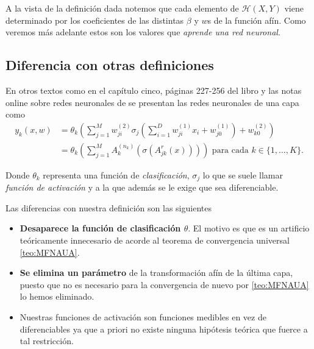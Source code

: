 A la vista de la definición dada notemos que cada elemento de 
$\mathcal{H}(X,Y)$ viene determinado por los coeficientes 
de las distintas $\beta$ y  $w$s de la función afín. Como veremos más adelante estos son los valores que \textit{aprende una red neuronal}.

\subsection*{Diferencia con otras definiciones}  \label{subsection:diferencia-otras-definiciones-RRNN}

En otros textos como en el capítulo cinco, páginas 227-256 del libro \cite{BishopPaterRecognition} y las notas online sobre redes neuronales de \cite{MostafaLearningFromData} se presentan las redes neuronales de una capa como 
\begin{align}
    y_k(x,w) &= \theta_k 
    \left( 
        \sum^M_{j=1} w_{ji}^{(2)}
        \sigma_j 
        \left(
            \sum_{i=1}^D w_{ji}^{(1)} x_i + w_{j0}^{(1)}
        \right)
        + w_{k0}^{(2)}
    \right) 
    \\
    & = 
    \theta_k 
    \left( 
        \sum^M_{j=1} A^{(n_k)}_{k}
        \left(
            \sigma 
            \left(
                A^{r}_{j k}
                \left(
                    x
                \right)
            \right)
        \right)
    \right)
    \text{ para cada  } k \in \{1, \ldots, K \}.
\end{align}

Donde $\theta_k$ representa una función de \textit{clasificación}, 
$\sigma_j$ lo que se suele llamar \textit{función de activación} y a la que además se le exige que sea diferenciable.

Las diferencias con nuestra definición son las siguientes 
\begin{itemize}
    \item \textbf{Desaparece la función de clasificación $\theta$}. El motivo es que es un artificio teóricamente innecesario de acorde al teorema de convergencia universal \ref{teo:MFNAUA}.
    \item \textbf{Se elimina un parámetro} de la transformación afín de la última capa, puesto que no es necesario para la convergencia de nuevo por \ref{teo:MFNAUA} lo hemos eliminado.
    \item Nuestras funciones de activación son funciones medibles en vez de diferenciables ya que a priori no existe ninguna hipótesis teórica que fuerce a tal restricción.
\end{itemize}

